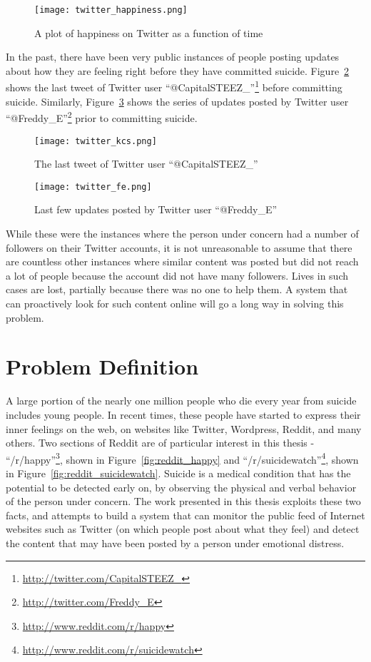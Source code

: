 \begin{figure}
    \centering
    \texttt{[image: twitter\_happiness.png]}
    \caption{A plot of happiness on Twitter as a function of time}
    \label{fig:twitter_happiness}
\end{figure}

In the past, there have been very public instances of people posting updates about how they are feeling right before they have committed suicide. Figure~\ref{fig:twitter_kcs} shows the last tweet of Twitter user ``@CapitalSTEEZ\_''\footnote{\url{http://twitter.com/CapitalSTEEZ\_}} before committing suicide. Similarly, Figure~\ref{fig:twitter_fe} shows the series of updates posted by Twitter user ``@Freddy\_E''\footnote{\url{http://twitter.com/Freddy\_E}} prior to committing suicide.\\

\begin{figure}
    \centering
    \texttt{[image: twitter\_kcs.png]}
    \caption{The last tweet of Twitter user ``@CapitalSTEEZ\_''}
    \label{fig:twitter_kcs}
\end{figure}

\begin{figure}
    \centering
    \texttt{[image: twitter\_fe.png]}
    \caption{Last few updates posted by Twitter user ``@Freddy\_E''}
    \label{fig:twitter_fe}
\end{figure}

While these were the instances where the person under concern had a number of followers on their Twitter accounts, it is not unreasonable to assume that there are countless other instances where similar content was posted but did not reach a lot of people because the account did not have many followers. Lives in such cases are lost, partially because there was no one to help them. A system that can proactively look for such content online will go a long way in solving this problem.

\section{Problem Definition}
A large portion of the nearly one million people who die every year from suicide includes young people. In recent times, these people have started to express their inner feelings on the web, on websites like Twitter, Wordpress, Reddit, and many others. Two sections of Reddit are of particular interest in this thesis - ``/r/happy''\footnote{\url{http://www.reddit.com/r/happy}}, shown in Figure~\ref{fig:reddit_happy} and ``/r/suicidewatch''\footnote{\url{http://www.reddit.com/r/suicidewatch}}, shown in Figure~\ref{fig:reddit_suicidewatch}. Suicide is a medical condition that has the potential to be detected early on, by observing the physical and verbal behavior of the person under concern. The work presented in this thesis exploits these two facts, and attempts to build a system that can monitor the public feed of Internet websites such as Twitter (on which people post about what they feel) and detect the content that may have been posted by a person under emotional distress.\\

